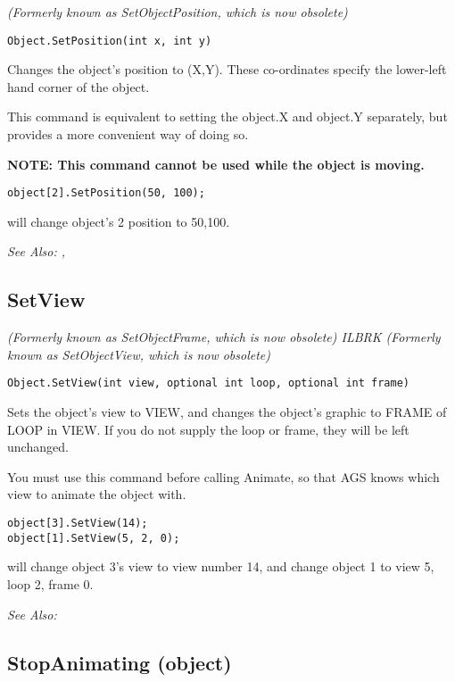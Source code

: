 \it{(Formerly known as SetObjectPosition, which is now obsolete)}

\begin{verbatim}
Object.SetPosition(int x, int y)
\end{verbatim}
Changes the object's position to (X,Y). These co-ordinates specify the lower-left
hand corner of the object.

This command is equivalent to setting the object.X and object.Y separately, but provides a
more convenient way of doing so.

\bf{NOTE:} This command cannot be used while the object is moving.

\begin{verbatim}
object[2].SetPosition(50, 100);
\end{verbatim}
will change object's 2 position to 50,100.

\it{See Also:} , 


\subsection{SetView}\label{Object.SetView}%

\it{(Formerly known as SetObjectFrame, which is now obsolete)} ILBRK
\it{(Formerly known as SetObjectView, which is now obsolete)}

\begin{verbatim}
Object.SetView(int view, optional int loop, optional int frame)
\end{verbatim}
Sets the object's view to VIEW, and changes the object's graphic to FRAME of LOOP in VIEW.
If you do not supply the loop or frame, they will be left unchanged.

You must use this command before calling Animate, so that AGS knows which view to animate
the object with.

\begin{verbatim}
object[3].SetView(14);
object[1].SetView(5, 2, 0);
\end{verbatim}
will change object 3's view to view number 14, and change object 1 to view 5, loop 2, frame 0.

\it{See Also:} 


\subsection{StopAnimating (object)}\label{Object.StopAnimating}%

